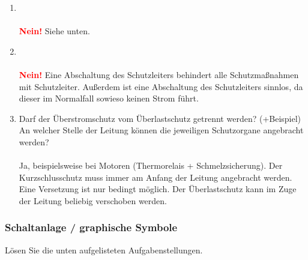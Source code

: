 \begin{enumerate}
    \item   {} \\\\
            \textbf{\textcolor{red}{Nein!}} Siehe unten.

    \item   {} \\\\
            \textbf{\textcolor{red}{Nein!}} Eine Abschaltung des Schutzleiters behindert alle Schutzmaßnahmen mit Schutzleiter.
            Außerdem ist eine Abschaltung des Schutzleiters sinnlos, da dieser im Normalfall sowieso keinen Strom führt.

    \item   Darf der Überstromschutz vom Überlastschutz getrennt werden? (+Beispiel) An welcher Stelle der Leitung können die jeweiligen Schutzorgane angebracht werden? \\\\
            Ja, beispielsweise bei Motoren (Thermorelais + Schmelzsicherung). Der Kurzschlusschutz muss immer am Anfang der Leitung angebracht werden. Eine Versetzung ist nur bedingt möglich. Der Überlastschutz
            kann im Zuge der Leitung beliebig verschoben werden.
\end{enumerate}

\subsubsection{Schaltanlage / graphische Symbole}
Lösen Sie die unten aufgelisteten Aufgabenstellungen.

